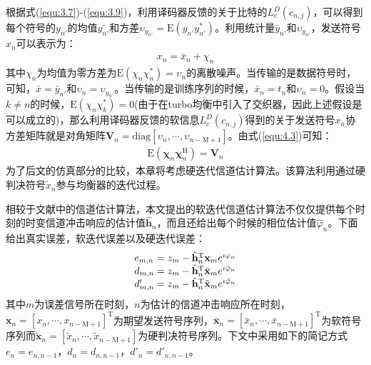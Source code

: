 根据式(\ref{equ:3.7})-(\ref{equ:3.9})，利用译码器反馈的关于比特的$L_e^D(c_{n,j})$，可以得到每个符号的$y_{{n}'}$的均值$\bar{y_{{n}'}}$和方差$\upsilon_{y_{{n}'}}=\mathrm{E}(y_{{n}'}y_{{n}'}^*)$。利用统计量$\bar{y}_{{n}'}$和$\upsilon_{y_{{n}'}}$，发送符号$x_n$可以表示为：
\begin{eqnarray}
    x_n=\bar{x}_n+\chi_n
    \label{equ:4.3}
\end{eqnarray}
其中$\chi_n$为均值为零方差为$\mathrm{E}(\chi_n\chi_n^*)=\upsilon_n$的离散噪声。当传输的是数据符号时，可知，$\bar{x}=\bar{y}_{{n}'}$和$\upsilon_n=\upsilon_{y_{{n}'}}$。当传输的是训练序列的时候，$\bar{x}_n=t_n$和$\upsilon_n=0$。假设当$k\neq
n$的时候，$\mathrm{E}(\chi_n\chi_k^*)=0$(由于在turbo均衡中引入了交织器，因此上述假设是可以成立的)，那么利用译码器反馈的软信息$L_e^D(c_{n,j})$得到的关于发送符号$x_n$协方差矩阵就是对角矩阵$\mathbf{V}_n=\mathrm{diag}[\upsilon_n,\cdots,\upsilon_{n-\mathrm{M}+1}]$。由式(\ref{equ:4.3})可知：
\begin{eqnarray}
    \mathrm{E}(\boldsymbol{\chi}_n\boldsymbol{\chi}_n^{\mathrm{H}})=\mathbf{V}_n
    \label{equ:4.4}
\end{eqnarray}
为了后文的仿真部分的比较，本章将考虑硬迭代信道估计算法。该算法利用通过硬判决符号$\tilde{x}_n$参与均衡器的迭代过程。

相较于文献中的信道估计算法，本文提出的软迭代信道估计算法不仅仅提供每个时刻的时变信道冲击响应的估计值$\hat{\mathbf{h}}_n$，而且还给出每个时候的相位估计值$\hat{\varphi}_n$。下面给出真实误差，软迭代误差以及硬迭代误差：
\begin{eqnarray}
    \begin{array}{l@{\;=\;}l}
        e_{m,n}&z_m-\hat{\mathbf{h}}_n^{\mathrm{T}}\mathbf{x}_me^{\imath\varphi_n}\\
        d_{m,n}&z_m-\hat{\mathbf{h}}_n^{\mathrm{T}}\bar{\mathbf{x}}_me^{\imath\hat{\varphi}_n}\\
        {d}'_{m,n}&z_m-\hat{\mathbf{h}}_n^{\mathrm{T}}\tilde{\mathbf{x}}_me^{\imath\tilde{\varphi}_n}\\
    \end{array}
    \label{equ:4.5}
\end{eqnarray}
其中$m$为误差信号所在时刻，$n$为估计的信道冲击响应所在时刻，$\mathbf{x}_n=[x_n,\cdots,x_{n-\mathrm{M}+1}]^{\mathrm{T}}$为期望发送符号序列，$\bar{\mathbf{x}}_n=[\bar{x}_n,\cdots,\bar{x}_{n-\mathrm{M}+1}]^{\mathrm{T}}$为软符号序列而$\tilde{\mathbf{x}}_n=[\tilde{x}_n,\cdots,\tilde{x}_{n-\mathrm{M}+1}]$为硬判决符号序列。下文中采用如下的简记方式$e_n=e_{n,n-1}\mbox{，}d_n=d_{n,n-1}\mbox{，}{d}'_n={d}'_{n,n-1}$。
